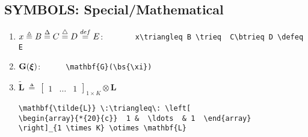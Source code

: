 \subsection{SYMBOLS: Special/Mathematical}
%
\begin{enumerate}
\item 
$x\triangleq B \trieq  C \btrieq D \defeq E$:~~~~~~
\verb! x\triangleq B \trieq  C\btrieq D \defeq E!\par
%
\item
$\mathbf{G}(\mbox{$\boldsymbol{\xi}$})$:~~~~~~\verb!\mathbf{G}(\bs{\xi})!\par
%
\item
$\mathbf{\tilde{L}} \:\triangleq\: \left[ 
\begin{array}{*{20}{c}}  1 &  \ldots  & 1  \end{array}
\right]_{1 \times K} \otimes \mathbf{L} $
%
\begin{verbatim}
\mathbf{\tilde{L}} \:\triangleq\: \left[ 
\begin{array}{*{20}{c}}  1 &  \ldots  & 1  \end{array}
\right]_{1 \times K} \otimes \mathbf{L} 
\end{verbatim}
\end{enumerate}
%
